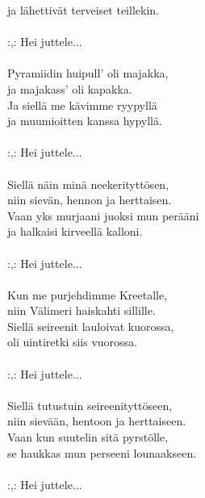         ja lähettivät terveiset teillekin. \\
\hspace{10mm} \\
        :,: Hei juttele... \\
\hspace{10mm} \\
        Pyramiidin huipull' oli majakka, \\
        ja majakass' oli kapakka. \\
        Ja siellä me kävimme ryypyllä \\
        ja muumioitten kanssa hypyllä. \\
\hspace{10mm} \\
        :,: Hei juttele... \\
\hspace{10mm} \\
        Siellä näin minä neekerityttösen, \\
        niin sievän, hennon ja herttaisen. \\
        Vaan yks murjaani juoksi mun perääni \\
        ja halkaisi kirveellä kalloni. \\
\hspace{10mm} \\
        :,: Hei juttele... \\
\hspace{10mm} \\
        Kun me purjehdimme Kreetalle, \\
        niin Välimeri haiskahti sillille. \\
        Siellä seireenit lauloivat kuorossa, \\
        oli uintiretki siis vuorossa. \\
\hspace{10mm} \\
        :,: Hei juttele... \\
\hspace{10mm} \\
        Siellä tutustuin seireenityttöseen, \\
        niin sievään, hentoon ja herttaiseen. \\
        Vaan kun suutelin sitä pyrstölle, \\
        se haukkas mun perseeni lounaakseen. \\
\hspace{10mm} \\
        :,: Hei juttele... \\
